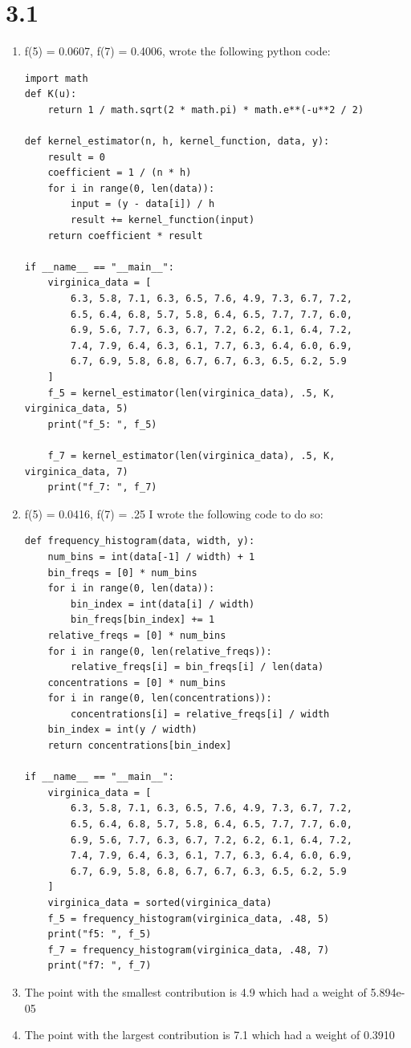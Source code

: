 \documentclass{article}
\begin{document}
\section*{3.1}
\begin{enumerate}
\item f(5) = 0.0607, f(7) = 0.4006, wrote the following python code: \\
\begin{verbatim}
import math
def K(u):
    return 1 / math.sqrt(2 * math.pi) * math.e**(-u**2 / 2) 

def kernel_estimator(n, h, kernel_function, data, y):
    result = 0
    coefficient = 1 / (n * h)
    for i in range(0, len(data)):
        input = (y - data[i]) / h
        result += kernel_function(input)
    return coefficient * result

if __name__ == "__main__":
    virginica_data = [
        6.3, 5.8, 7.1, 6.3, 6.5, 7.6, 4.9, 7.3, 6.7, 7.2,
        6.5, 6.4, 6.8, 5.7, 5.8, 6.4, 6.5, 7.7, 7.7, 6.0,
        6.9, 5.6, 7.7, 6.3, 6.7, 7.2, 6.2, 6.1, 6.4, 7.2,
        7.4, 7.9, 6.4, 6.3, 6.1, 7.7, 6.3, 6.4, 6.0, 6.9,
        6.7, 6.9, 5.8, 6.8, 6.7, 6.7, 6.3, 6.5, 6.2, 5.9
    ]
    f_5 = kernel_estimator(len(virginica_data), .5, K, virginica_data, 5)
    print("f_5: ", f_5)

    f_7 = kernel_estimator(len(virginica_data), .5, K, virginica_data, 7)
    print("f_7: ", f_7)
\end{verbatim}
\item f(5) = 0.0416, f(7) = .25 I wrote the following code to do so: \\
\begin{verbatim}
def frequency_histogram(data, width, y):
    num_bins = int(data[-1] / width) + 1
    bin_freqs = [0] * num_bins
    for i in range(0, len(data)):
        bin_index = int(data[i] / width)
        bin_freqs[bin_index] += 1
    relative_freqs = [0] * num_bins
    for i in range(0, len(relative_freqs)):
        relative_freqs[i] = bin_freqs[i] / len(data)
    concentrations = [0] * num_bins
    for i in range(0, len(concentrations)):
        concentrations[i] = relative_freqs[i] / width
    bin_index = int(y / width)
    return concentrations[bin_index]

if __name__ == "__main__":
    virginica_data = [
        6.3, 5.8, 7.1, 6.3, 6.5, 7.6, 4.9, 7.3, 6.7, 7.2,
        6.5, 6.4, 6.8, 5.7, 5.8, 6.4, 6.5, 7.7, 7.7, 6.0,
        6.9, 5.6, 7.7, 6.3, 6.7, 7.2, 6.2, 6.1, 6.4, 7.2,
        7.4, 7.9, 6.4, 6.3, 6.1, 7.7, 6.3, 6.4, 6.0, 6.9,
        6.7, 6.9, 5.8, 6.8, 6.7, 6.7, 6.3, 6.5, 6.2, 5.9
    ]
    virginica_data = sorted(virginica_data)
    f_5 = frequency_histogram(virginica_data, .48, 5)
    print("f5: ", f_5)
    f_7 = frequency_histogram(virginica_data, .48, 7)
    print("f7: ", f_7)
\end{verbatim}
\item The point with the smallest contribution is 4.9 which had a weight of 5.894e-05 \\
\item The point with the largest contribution is 7.1 which had a weight of 0.3910
\end{enumerate}
\end{document}
